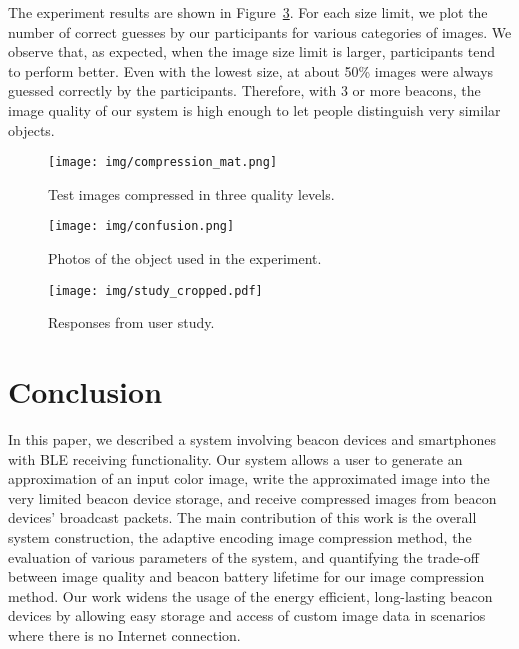 
The experiment results are shown in Figure~\ref{fig:confusion2}. For each size limit, we plot the number of correct guesses by our participants for various categories of images. We observe that, as expected, when the image size limit is larger, participants tend to perform better. Even with the lowest size, at about 50\% images were always guessed correctly by the participants. Therefore, with 3 or more beacons, the image quality of our system is high enough to let people distinguish very similar objects.

\begin{figure}[!htb]
	\begin{center}
		\texttt{[image: img/compression\_mat.png]}
		\caption{Test images compressed in three quality levels.}
		\label{fig:compression_mat}
	\end{center}
	\vspace{-1.5em}
\end{figure}

\begin{figure}[!htb]
	\begin{center}
		\texttt{[image: img/confusion.png]}
		\caption{Photos of the object used in the experiment.}
		\label{fig:confusion}
	\end{center}
	\vspace{-1.5em}
\end{figure}


\begin{figure}[!htb]
	\begin{center}
		\texttt{[image: img/study\_cropped.pdf]}
		\caption{Responses from user study.}
		\label{fig:confusion2}
	\end{center}
	\vspace{-1.5em}
\end{figure}



\section{Conclusion}
\label{sec:conclusion}
In this paper, we described a system involving beacon devices and smartphones with BLE receiving functionality. Our system allows a user to generate an approximation of an input color image, write the approximated image into the very limited beacon device storage, and receive compressed images from beacon devices' broadcast packets. The main contribution of this work is the overall system construction, the adaptive encoding image compression method, the evaluation of various parameters of the system, and quantifying the trade-off between image quality and beacon battery lifetime for our image compression method. Our work widens the usage of the energy efficient, long-lasting beacon devices by allowing easy storage and access of custom image data in scenarios where there is no Internet connection.

